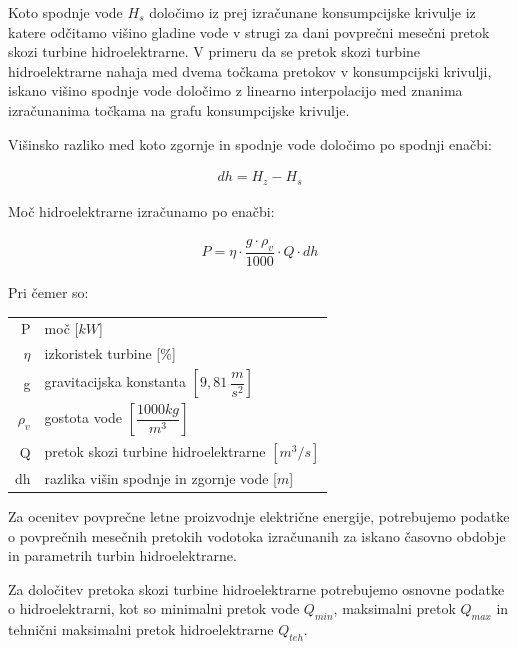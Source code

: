  Koto spodnje vode $H_s$ določimo iz prej izračunane konsumpcijske krivulje iz katere odčitamo višino gladine vode v strugi za dani povprečni mesečni pretok skozi turbine hidroelektrarne. V primeru da se pretok skozi turbine hidroelektrarne nahaja med dvema točkama pretokov v konsumpcijski krivulji, iskano višino spodnje vode določimo z linearno interpolacijo med znanima izračunanima točkama na grafu konsumpcijske krivulje.


Višinsko razliko med koto zgornje in spodnje vode določimo po spodnji enačbi:

\begin{ceqn}
\begin{align}
dh = H_z - H_s
\end{align}
\end{ceqn}

Moč hidroelektrarne izračunamo po enačbi:

\begin{ceqn}
\begin{align}
P = \eta \cdot \dfrac{g \cdot \rho_v}{1000} \cdot Q \cdot dh \label{eq:mocHidroelektrarne}
\end{align}
\end{ceqn}

Pri čemer so:
\begin{table}[htb!]
	\begin{tabular}{r|p{10cm}}
		P & moč [$kW$]\\
		$\eta$ & izkoristek turbine [\%]\\
		g & gravitacijska konstanta $\left[9,81~\dfrac{m}{s^{2}}\right]$ \\
		$\rho_v$&gostota vode $\left[\dfrac{1000 kg}{m^3}\right]$\\
		Q & pretok skozi turbine hidroelektrarne $\left[m^{3}/s \right]$\\
		dh & razlika višin spodnje in zgornje vode [$m$]
	\end{tabular}
\end{table}



Za ocenitev povprečne letne proizvodnje električne energije, potrebujemo podatke o povprečnih mesečnih pretokih vodotoka izračunanih za iskano časovno obdobje in parametrih turbin hidroelektrarne.

Za določitev pretoka skozi turbine hidroelektrarne potrebujemo osnovne podatke o hidroelektrarni, kot so minimalni pretok vode $Q_{min}$, maksimalni pretok $Q_{max}$ in tehnični maksimalni pretok hidroelektrarne $Q_{teh}$.

